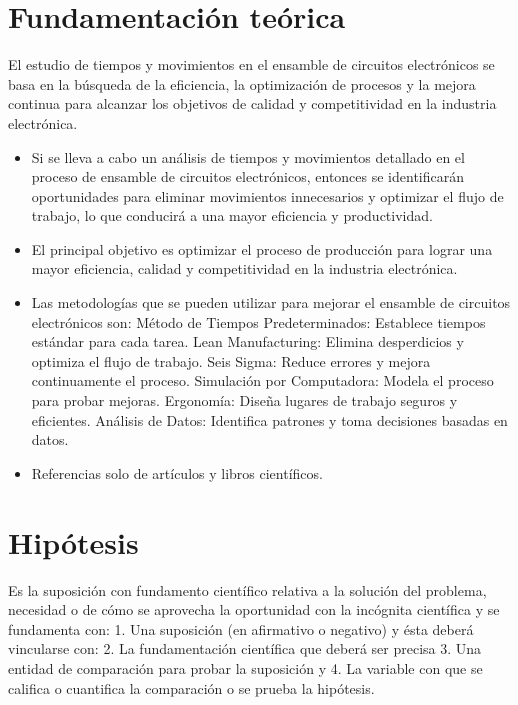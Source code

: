     \section{Fundamentación teórica}
    
    El estudio de tiempos y movimientos en el ensamble de circuitos electrónicos se basa en la búsqueda de la eficiencia, la optimización de procesos y la mejora continua para alcanzar los objetivos de calidad y competitividad en la industria electrónica.
    \begin{itemize}
        \item Si se lleva a cabo un análisis de tiempos y movimientos detallado en el proceso de ensamble de circuitos electrónicos, entonces se identificarán oportunidades para eliminar movimientos innecesarios y optimizar el flujo de trabajo, lo que conducirá a una mayor eficiencia y productividad.
        \item El principal objetivo es optimizar el proceso de producción para lograr una mayor eficiencia, calidad y competitividad en la industria electrónica.
        \item Las metodologías que se pueden utilizar para mejorar el ensamble de circuitos electrónicos son:
     Método de Tiempos Predeterminados: Establece tiempos estándar para cada tarea.
    Lean Manufacturing: Elimina desperdicios y optimiza el flujo de trabajo.
    Seis Sigma: Reduce errores y mejora continuamente el proceso.
    Simulación por Computadora: Modela el proceso para probar mejoras.
    Ergonomía: Diseña lugares de trabajo seguros y eficientes.
    Análisis de Datos: Identifica patrones y toma decisiones basadas en datos.
    
        \item Referencias solo de artículos y libros científicos.
    \end{itemize}
    \section{Hipótesis}
    
    Es la suposición con fundamento científico relativa a la solución del problema, necesidad o de cómo se aprovecha la oportunidad con la incógnita científica y se fundamenta con: 1. Una suposición (en afirmativo o negativo) y ésta deberá vincularse con:
    2. La fundamentación científica que deberá ser precisa 3. Una entidad de comparación para probar la suposición y
    4. La variable con que se califica o cuantifica la comparación o se prueba la hipótesis.
    
